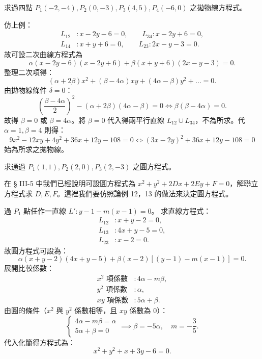 \begin{discussion}
求過四點 $P_1(-2, -4), P_2(0, -3), P_3(4, 5), P_4(-6, 0)$ 之拋物線方程式。
\end{discussion}

\begin{solution}
仿上例：
\[
\begin{aligned}
L_{12}&: x - 2y - 6 = 0, \qquad L_{34}: x - 2y + 6 = 0, \\
L_{14}&: x + y + 6 = 0, \qquad L_{23}: 2x - y - 3 = 0.
\end{aligned}
\]
故可設二次曲線方程式為
\[
\alpha(x - 2y - 6)(x - 2y + 6) + \beta(x + y + 6)(2x - y - 3) = 0.
\]
整理二次項得：
\[
(\alpha + 2\beta)x^2 + (\beta - 4\alpha)xy + (4\alpha - \beta)y^2 + \dots = 0.
\]
由拋物線條件 $\delta = 0$：
\[
\left(\frac{\beta - 4\alpha}{2}\right)^2 - (\alpha + 2\beta)(4\alpha - \beta) = 0 \iff \beta(\beta - 4\alpha) = 0.
\]
故得 $\beta = 0$ 或 $\beta = 4\alpha$。將 $\beta = 0$ 代入得兩平行直線 $L_{12} \cup L_{34}$，不為所求。代 $\alpha = 1, \beta = 4$ 則得：
\[
9x^2 - 12xy + 4y^2 + 36x + 12y - 108 = 0 \iff (3x - 2y)^2 + 36x + 12y - 108 = 0
\]
始為所求之拋物線。
\end{solution}

\begin{discussion}
求通過 $P_1(1, 1), P_2(2, 0), P_3(2, -3)$ 之圓方程式。
\end{discussion}

\begin{solution}
在 § III-5 中我們已經說明可設圓方程式為 $x^2 + y^2 + 2Dx + 2Ey + F = 0$，解聯立方程式求 $D, E, F$。這裡我們要仿照論例 12，13 的做法來決定圓方程式。

過 $P_1$ 點任作一直線 $L': y - 1 - m(x - 1) = 0$。
求直線方程式：
\[
\begin{aligned}
L_{12}&: x + y - 2 = 0, \\
L_{13}&: 4x + y - 5 = 0, \\
L_{23}&: x - 2 = 0.
\end{aligned}
\]
故圓方程式可設為：
\[
\alpha(x + y - 2)(4x + y - 5) + \beta(x - 2)[(y - 1) - m(x - 1)] = 0.
\]
展開比較係數：
\[
\begin{aligned}
x^2 \text{ 項係數}&: 4\alpha - m\beta, \\
y^2 \text{ 項係數}&: \alpha, \\
xy \text{ 項係數}&: 5\alpha + \beta.
\end{aligned}
\]
由圓的條件（$x^2$ 與 $y^2$ 係數相等，且 $xy$ 係數為 0）：
\[
\begin{cases}
4\alpha - m\beta = \alpha \\
5\alpha + \beta = 0
\end{cases}
\implies \beta = -5\alpha, \quad m = -\frac{3}{5}.
\]
代入化簡得方程式為：
\[
x^2 + y^2 + x + 3y - 6 = 0.
\]
\end{solution}

